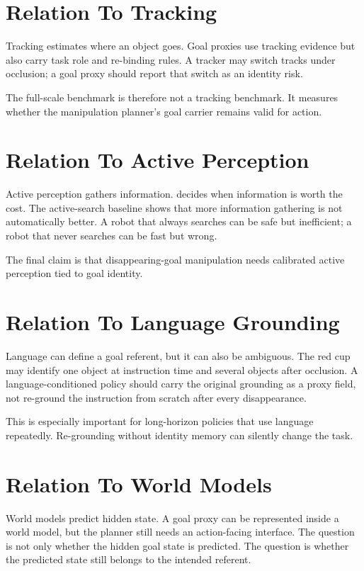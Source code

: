 \section{Relation To Tracking}

Tracking estimates where an object goes. Goal proxies use tracking evidence but also carry task role and re-binding rules. A tracker may switch tracks under occlusion; a goal proxy should report that switch as an identity risk.

The full-scale benchmark is therefore not a tracking benchmark. It measures whether the manipulation planner's goal carrier remains valid for action.

\section{Relation To Active Perception}

Active perception gathers information. \method decides when information is worth the cost. The active-search baseline shows that more information gathering is not automatically better. A robot that always searches can be safe but inefficient; a robot that never searches can be fast but wrong.

The final claim is that disappearing-goal manipulation needs calibrated active perception tied to goal identity.

\section{Relation To Language Grounding}

Language can define a goal referent, but it can also be ambiguous. The red cup may identify one object at instruction time and several objects after occlusion. A language-conditioned policy should carry the original grounding as a proxy field, not re-ground the instruction from scratch after every disappearance.

This is especially important for long-horizon policies that use language repeatedly. Re-grounding without identity memory can silently change the task.

\section{Relation To World Models}

World models predict hidden state. A goal proxy can be represented inside a world model, but the planner still needs an action-facing interface. The question is not only whether the hidden goal state is predicted. The question is whether the predicted state still belongs to the intended referent.

